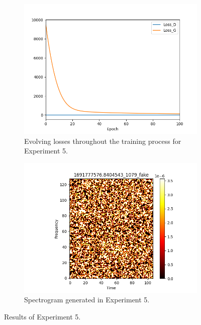 \begin{figure}[!ht]
    \centering
    \begin{subfigure}{0.45\textwidth}
        \includegraphics[width=\textwidth]{figures/4.5-results/exp5_loss.png}
        \caption{Evolving losses throughout the training process for Experiment 5.}
        \label{fig:exp5_loss}
    \end{subfigure}
    \begin{subfigure}{0.45\textwidth}
        \includegraphics[width=\textwidth]{figures/4.5-results/exp5_spectrogram.png}
        \caption{Spectrogram generated in Experiment 5.}
        \label{fig:exp5_spectrogram}
    \end{subfigure}
    \caption{Results of Experiment 5.}
    \label{fig:exp5_results}
\end{figure}